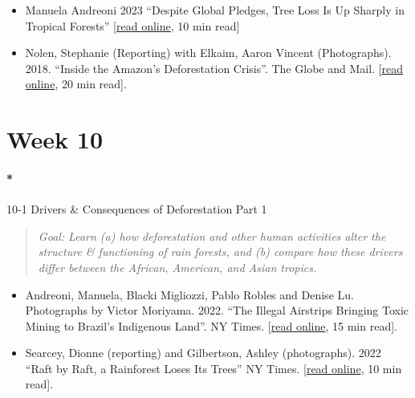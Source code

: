 \documentclass[
  10pt,
  letterpaper,
  oneside,
  open=any]{scrbook}
\let\oldparagraph\paragraph
\renewcommand{\paragraph}[1]{\oldparagraph{#1}\mbox{}}
\begin{document}
\begin{itemize}
\item
  Manuela Andreoni 2023 ``Despite Global Pledges, Tree Loss Is Up
  Sharply in Tropical Forests''
  {[}\href{https://www.nytimes.com/2023/06/27/climate/trees-tropical-forests-deforestation.html}{read
  online}, 10 min read{]}
\item
  Nolen, Stephanie (Reporting) with Elkaim, Aaron Vincent (Photographs).
  2018. ``Inside the Amazon's Deforestation Crisis''. The Globe and
  Mail.
  {[}\href{https://www.theglobeandmail.com/news/world/amazon-rainforest-deforestation-crisis/article37722932/}{read
  online}, 20 min read{]}.
\end{itemize}

\section*{Week 10}\label{week-10}


\paragraph*{10-1 Drivers \& Consequences of Deforestation Part
1}\label{drivers-consequences-of-deforestation-part-1}

\begin{quote}
\emph{Goal: Learn (a) how deforestation and other human activities alter
the structure \& functioning of rain forests, and (b) compare how these
drivers differ between the African, American, and Asian tropics.}
\end{quote}

\begin{itemize}
\item
  Andreoni, Manuela, Blacki Migliozzi, Pablo Robles and Denise Lu.
  Photographs by Victor Moriyama. 2022. ``The Illegal Airstrips Bringing
  Toxic Mining to Brazil's Indigenous Land''. NY Times.
  {[}\href{https://www.nytimes.com/interactive/2022/08/02/world/americas/brazil-airstrips-illegal-mining.html}{read
  online}, 15 min read{]}.
\item
  Searcey, Dionne (reporting) and Gilbertson, Ashley (photographs). 2022
  ``Raft by Raft, a Rainforest Loses Its Trees'' NY Times.
  {[}\href{https://www.nytimes.com/interactive/2022/06/14/climate/congo-rainforest-logging.html}{read
  online}, 10 min read{]}.
\end{itemize}
\end{document}
